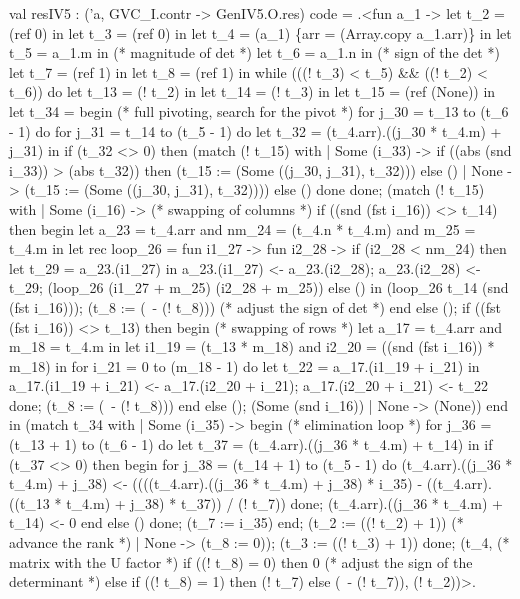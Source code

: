 \documentclass[draft]{elsart}
\begin{document}
\begin{code2}
val resIV5 : ('a, GVC_I.contr -> GenIV5.O.res) code =
  .<fun a_1 ->
   let t_2 = (ref 0) in
   let t_3 = (ref 0) in
   let t_4 = (a_1) \{arr = (Array.copy a_1.arr)\} in
   let t_5 = a_1.m in  (* magnitude of det *)
   let t_6 = a_1.n in  (* sign of the det *)
   let t_7 = (ref 1) in
   let t_8 = (ref 1) in
   while (((! t_3) < t_5) && ((! t_2) < t_6)) do
    let t_13 = (! t_2) in
    let t_14 = (! t_3) in
    let t_15 = (ref (None)) in
    let t_34 =
     begin (* full pivoting, search for the pivot *)
      for j_30 = t_13 to (t_6 - 1) do
       for j_31 = t_14 to (t_5 - 1) do
        let t_32 = (t_4.arr).((j_30 * t_4.m) + j_31) in
        if (t_32 <> 0) then
         (match (! t_15) with
          | Some (i_33) ->
             if ((abs (snd i_33)) > (abs t_32)) then
              (t_15 := (Some ((j_30, j_31), t_32)))
             else ()
          | None -> (t_15 := (Some ((j_30, j_31), t_32))))
        else ()
       done
      done;
      (match (! t_15) with
       | Some (i_16) -> (* swapping of columns *)
          if ((snd (fst i_16)) <> t_14) then begin
           let a_23 = t_4.arr
           and nm_24 = (t_4.n * t_4.m)
           and m_25 = t_4.m in
           let rec loop_26 =
            fun i1_27 ->
             fun i2_28 ->
              if (i2_28 < nm_24) then
               let t_29 = a_23.(i1_27) in
               a_23.(i1_27) <- a_23.(i2_28);
               a_23.(i2_28) <- t_29;
               (loop_26 (i1_27 + m_25) (i2_28 + m_25))
              else () in
           (loop_26 t_14 (snd (fst i_16)));
           (t_8 := (~- (! t_8))) (* adjust the sign of det *)
          end else ();
          if ((fst (fst i_16)) <> t_13) then begin (* swapping of rows *)
           let a_17 = t_4.arr
           and m_18 = t_4.m in
           let i1_19 = (t_13 * m_18)
           and i2_20 = ((snd (fst i_16)) * m_18) in
           for i_21 = 0 to (m_18 - 1) do
            let t_22 = a_17.(i1_19 + i_21) in
            a_17.(i1_19 + i_21) <- a_17.(i2_20 + i_21);
            a_17.(i2_20 + i_21) <- t_22
           done;
           (t_8 := (~- (! t_8)))
          end else ();
          (Some (snd i_16))
       | None -> (None))
     end in
    (match t_34 with
     | Some (i_35) ->
        begin (* elimination loop *)
         for j_36 = (t_13 + 1) to (t_6 - 1) do
          let t_37 = (t_4.arr).((j_36 * t_4.m) + t_14) in
          if (t_37 <> 0) then begin
           for j_38 = (t_14 + 1) to (t_5 - 1) do
            (t_4.arr).((j_36 * t_4.m) + j_38) <-
             ((((t_4.arr).((j_36 * t_4.m) + j_38) * i_35) -
                ((t_4.arr).((t_13 * t_4.m) + j_38) * t_37)) / (! t_7))
           done;
           (t_4.arr).((j_36 * t_4.m) + t_14) <- 0
          end else ()
         done;
         (t_7 := i_35)
        end;
        (t_2 := ((! t_2) + 1)) (* advance the rank *)
     | None -> (t_8 := 0));
    (t_3 := ((! t_3) + 1))
   done;
   (t_4, (* matrix with the U factor *)
    if ((! t_8) = 0) then 0 (* adjust the sign of the determinant *)
    else if ((! t_8) = 1) then (! t_7)
    else (~- (! t_7)), (! t_2))>.
\end{code2}
\end{document}
